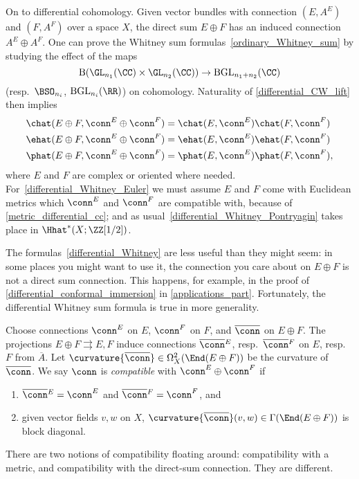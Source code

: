 On to differential cohomology. Given vector bundles with connection $(E, A^E)$ and $(F, A^F)$ over a
space $X$, the direct sum $E\oplus F$ has an induced connection $A^E\oplus A^F$. One can prove the Whitney
sum formulas~\eqref{ordinary_Whitney_sum} by studying the effect of the maps 
\[\mathrm B(\GL_{n_1}(\CC)\times\GL_{n_2}(
\CC))\to \mathrm{BGL}_{n_1 + n_2}(\CC)\]
(resp.\ $\BSO_{n_i}$, $\mathrm{BGL}_{n_i}(\RR)$) on cohomology. Naturality of
\cref{differential_CW_lift} then implies
\begin{subequations}
\label{differential_Whitney}
\begin{align}
	\chat(E\oplus F,  \conn^E\oplus \conn^F) &= \chat(E,  \conn^E)\chat(F,  \conn^F)\\
	\label{differential_Whitney_Euler}
	\ehat(E\oplus F,  \conn^E\oplus \conn^F) &= \ehat(E,  \conn^E)\ehat(F,  \conn^F)\\
	\phat(E\oplus F,  \conn^E\oplus \conn^F) &= \phat(E,  \conn^E)\phat(F,  \conn^F),
	\label{differential_Whitney_Pontryagin}
\end{align}
\end{subequations}
where $E$ and $F$ are complex or oriented where needed. For~\eqref{differential_Whitney_Euler} we must assume $E$
and $F$ come with Euclidean metrics which $\conn^E$ and $\conn^F$ are compatible with, because of
\cref{metric_differential_cc}; and as usual~\eqref{differential_Whitney_Pontryagin} takes
place in $\Hhat^*(X;\ZZ[1/2])$.

The formulas~\eqref{differential_Whitney} are less useful than they might seem: in some places you might want to
use it, the connection you care about on $E\oplus F$ is not a direct sum connection. This happens, for example, in
the proof of \cref{differential_conformal_immersion} in \cref{applications_part}. Fortunately, the differential
Whitney sum formula is true in more generality.
\begin{defn}
\label{compatible_connection}
Choose connections $\conn^E$ on $E$, $\conn^F$ on $F$, and $\overline{\conn}$ on $E\oplus F$. The projections
$E\oplus F\rightrightarrows E, F$ induce connections $\overline{\conn}{}^E$, resp.\ $\overline{\conn}{}^F$ on $E$,
resp.\ $F$ from $\overline A$. 
Let $\curvature{\overline{\conn}}\in\Omega_X^2(\End(E\oplus F))$ be the curvature of
$\overline{\conn}$. We say $\conn$ is \textit{compatible} with $\conn^E\oplus\conn^F$ if
\begin{enumerate}[(1)]
	\item $\overline{\conn}{}^E =  \conn^E$ and $\overline{\conn}{}^F =  \conn^F$, and
	\item given vector fields $v,w$ on $X$, $\curvature{\overline{\conn}}(v, w)\in\Gamma(\End(E\oplus F))$ is block
	diagonal.
\end{enumerate}
\end{defn}
There are two notions of compatibility floating around: compatibility with a metric, and compatibility with the
direct-sum connection. They are different.

